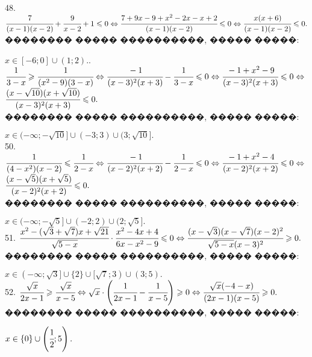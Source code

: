 \documentclass[12pt]{article}
\begin{document}
48. $\cfrac{7}{(x-1)(x-2)}+\cfrac{9}{x-2}+1\leqslant0\Leftrightarrow \cfrac{7+9x-9+x^2-2x-x+2}{(x-1)(x-2)}\leqslant0
\Leftrightarrow \cfrac{x(x+6)}{(x-1)(x-2)}\leqslant0.$ �������� ����� ����������, ����� �����:
\begin{figure}[ht!]
\end{figure}
$x\in[-6;0]\cup(1;2).$\newpage{}. $\cfrac{1}{3-x}\geqslant\cfrac{1}{(x^2-9)(3-x)}\Leftrightarrow\cfrac{-1}{(x-3)^2(x+3)}-\cfrac{1}{3-x}\leqslant0\Leftrightarrow
\cfrac{-1+x^2-9}{(x-3)^2(x+3)}\leqslant0\Leftrightarrow$\\$\cfrac{(x-\sqrt{10})(x+\sqrt{10})}{(x-3)^2(x+3)}\leqslant0.$\\ �������� ����� ����������, ����� �����:
\begin{figure}[ht!]
\end{figure}
$x\in(-\infty;-\sqrt{10}]\cup(-3;3)\cup(3;\sqrt{10}].$\\
50. $\cfrac{1}{(4-x^2)(x-2)}\leqslant\cfrac{1}{2-x} \Leftrightarrow\cfrac{-1}{(x-2)^2(x+2)}-\cfrac{1}{2-x}\leqslant0\Leftrightarrow
\cfrac{-1+x^2-4}{(x-2)^2(x+2)}\leqslant0\Leftrightarrow$\\$\cfrac{(x-\sqrt{5})(x+\sqrt{5})}{(x-2)^2(x+2)}\leqslant0.$\\ �������� ����� ����������, ����� �����:
\begin{figure}[ht!]
\end{figure}
$x\in(-\infty;-\sqrt{5}]\cup(-2;2)\cup(2;\sqrt{5}].$\\
51. $\cfrac{x^2-(\sqrt{3}+\sqrt{7})x+\sqrt{21}}{\sqrt{5-x}}\cdot\cfrac{x^2-4x+4}{6x-x^2-9}\leqslant 0\Leftrightarrow
\cfrac{(x-\sqrt{3})(x-\sqrt{7})(x-2)^2}{\sqrt{5-x}(x-3)^2}\geqslant 0.$ �������� ����� ����������, ����� �����:
\begin{figure}[ht!]
\end{figure}
$x\in(-\infty;\sqrt{3}]\cup\{2\}\cup[\sqrt{7};3)\cup(3;5).$\\
52. $\cfrac{\sqrt{x}}{2x-1}\geqslant\cfrac{\sqrt{x}}{x-5}\Leftrightarrow\sqrt{x}\cdot\left(\cfrac{1}{2x-1}-\cfrac{1}{x-5}\right)\geqslant0\Leftrightarrow
\cfrac{\sqrt{x}(-4-x)}{(2x-1)(x-5)}\geqslant0.$ �������� ����� ����������, ����� �����:
\begin{figure}[ht!]
\end{figure}
$x\in\{0\}\cup\left(\cfrac{1}{2};5\right).$\\
\end{document}
